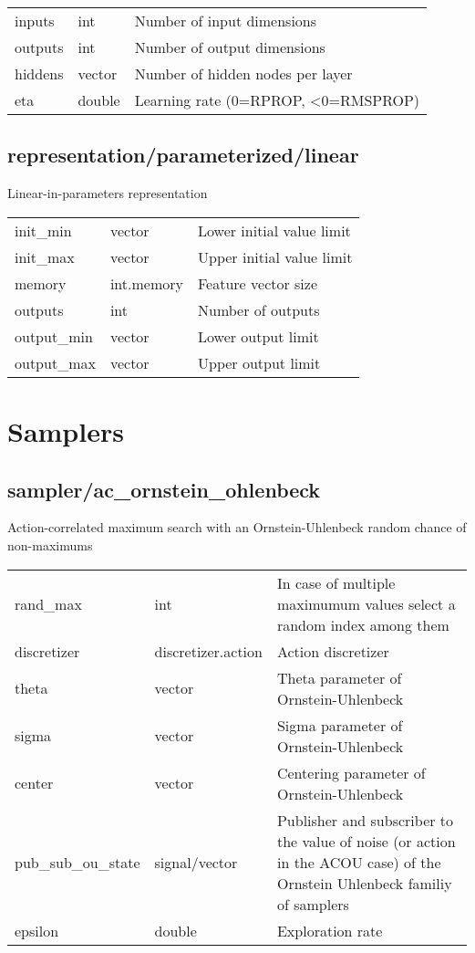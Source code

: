 \noindent\begin{tabular}{@{}lll@{}}
inputs&int&Number of input dimensions\\
outputs&int&Number of output dimensions\\
hiddens&vector&Number of hidden nodes per layer\\
eta&double&Learning rate (0=RPROP, <0=RMSPROP)\\
\end{tabular}
\subsection{representation/parameterized/linear}
\noindent Linear-in-parameters representation\\

\noindent\begin{tabular}{@{}lll@{}}
init\_min&vector&Lower initial value limit\\
init\_max&vector&Upper initial value limit\\
memory&int.memory&Feature vector size\\
outputs&int&Number of outputs\\
output\_min&vector&Lower output limit\\
output\_max&vector&Upper output limit\\
\end{tabular}
\section{Samplers}
\subsection{sampler/ac\_ornstein\_ohlenbeck}
\noindent Action-correlated maximum search with an Ornstein-Uhlenbeck random chance of non-maximums\\

\noindent\begin{tabular}{@{}lll@{}}
rand\_max&int&In case of multiple maximumum values select a random index among them\\
discretizer&discretizer.action&Action discretizer\\
theta&vector&Theta parameter of Ornstein-Uhlenbeck\\
sigma&vector&Sigma parameter of Ornstein-Uhlenbeck\\
center&vector&Centering parameter of Ornstein-Uhlenbeck\\
pub\_sub\_ou\_state&signal/vector&Publisher and subscriber to the value of noise (or action in the ACOU case) of the Ornstein Uhlenbeck familiy of samplers\\
epsilon&double&Exploration rate\\
\end{tabular}
